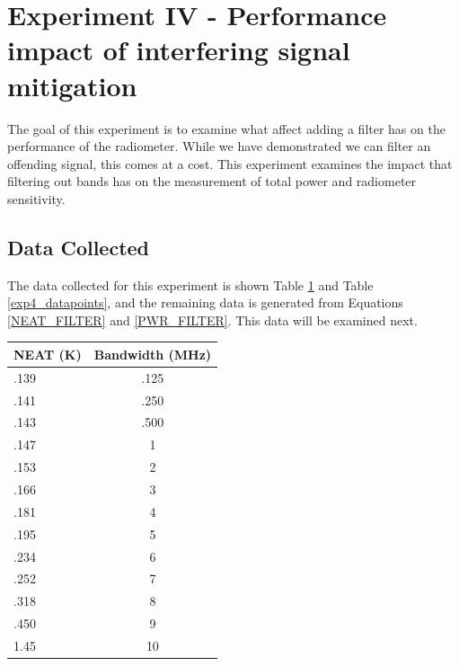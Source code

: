 \section{Experiment IV - Performance impact of interfering signal mitigation} \label{Exp4_results}
The goal of this experiment is to examine what affect adding a filter has on the performance of the radiometer.  While we have demonstrated we can filter an offending signal, this comes at a cost.  This experiment examines the impact that filtering out bands has on the measurement of total power and radiometer sensitivity.

\subsection{Data Collected}
The data collected for this experiment is shown Table \ref{exp4_data_power} and Table \ref{exp4_datapoints}, and the remaining data is generated from Equations \ref{NEAT_FILTER} and \ref{PWR_FILTER}.  This data will be examined next.

\begin{table}[h!tb] \centering
{}
\label{exp4_data_power}
\begin{tabular}{lc} \hline
\textbf{NEAT (K)} & \textbf{Bandwidth (MHz) } \\ \hline
.139 & .125 \\
.141 & .250 \\
.143 & .500 \\
.147 & 1 \\
.153 & 2 \\
.166 & 3 \\
.181 & 4 \\
.195 & 5 \\
.234 & 6 \\
.252 & 7 \\
.318 & 8 \\
.450 & 9 \\
1.45 & 10 \\ \hline
\end{tabular}
\end{table}


